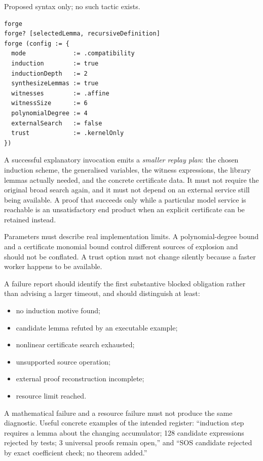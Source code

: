 Proposed syntax only; no such tactic exists.

\begin{lstlisting}
forge
forge? [selectedLemma, recursiveDefinition]
forge (config := {
  mode             := .compatibility
  induction        := true
  inductionDepth   := 2
  synthesizeLemmas := true
  witnesses        := .affine
  witnessSize      := 6
  polynomialDegree := 4
  externalSearch   := false
  trust            := .kernelOnly
})
\end{lstlisting}

A successful explanatory invocation emits a \emph{smaller replay plan}: the
chosen induction scheme, the generalised variables, the witness expressions, the
library lemmas actually needed, and the concrete certificate data. It must not
require the original broad search again, and it must not depend on an external
service still being available. A proof that succeeds only while a particular
model service is reachable is an unsatisfactory end product when an explicit
certificate can be retained instead.

Parameters must describe real implementation limits. A polynomial-degree bound
and a certificate monomial bound control different sources of explosion and
should not be conflated. A trust option must not change silently because a
faster worker happens to be available.

A failure report should identify the first substantive blocked obligation rather
than advising a larger timeout, and should distinguish at least:

\begin{itemize}[leftmargin=1.4em]
\item no induction motive found;
\item candidate lemma refuted by an executable example;
\item nonlinear certificate search exhausted;
\item unsupported source operation;
\item external proof reconstruction incomplete;
\item resource limit reached.
\end{itemize}

A mathematical failure and a resource failure must not produce the same
diagnostic. Useful concrete examples of the intended register: ``induction step
requires a lemma about the changing accumulator; 128 candidate expressions
rejected by tests; 3 universal proofs remain open,'' and ``SOS candidate
rejected by exact coefficient check; no theorem added.''

